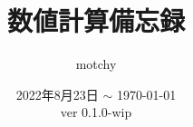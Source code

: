 \documentclass{ltjsarticle}
\def\docVerMajor{0}
\def\docVerMinor{1}
\def\docVerPatch{0}
\def\docVerWip{-wip} %
\def\docVer{\docVerMajor.\docVerMinor.\docVerPatch\docVerWip}
\begin{document}
    \title{数値計算備忘録}
    \author{motchy}
    \date{ 2022年8月23日 $\sim$ \today \\ver \docVer}
	\maketitle

    \newpage
    \tableofcontents

    \newpage
    
\end{document}
